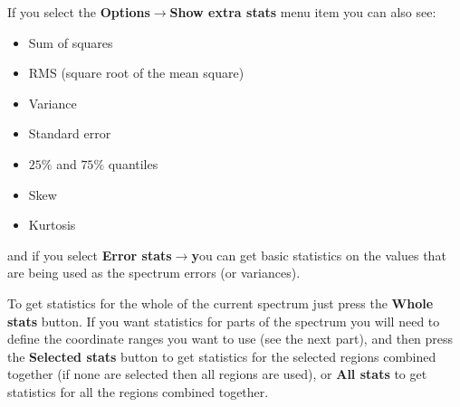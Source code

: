 \documentclass[twoside,11pt]{article}
\newcommand{\latexhtml}[2]{#1}
\renewcommand{\_}{\texttt{\symbol{95}}}
\newcommand{\submenuitem}[2]{\latexhtml{\textbf{#1$\rightarrow$#2}}{\textbf{#1->#2}}}
\newcommand{\labelitem}[1]{\textbf{#1}}
\begin{document}
If you select the \submenuitem{Options}{Show extra stats} menu item
you can also see:
\begin{itemize}
\item Sum of squares
\item RMS (square root of the mean square)
\item Variance
\item Standard error
\item $25\%$ and $75\%$ quantiles
\item Skew
\item Kurtosis
\end{itemize}
and if you select \submenuitem{Error stats} you can get basic statistics
on the values that are being used as the spectrum errors (or variances).

To get statistics for the whole of the current spectrum just press the
\labelitem{Whole stats} button. If you want statistics for parts of the
spectrum you will need to define the coordinate ranges you want to use (see
the next part), and then press the \labelitem{Selected stats} button to get
statistics for the selected regions combined together (if none are selected
then all regions are used), or \labelitem{All stats} to get statistics for all
the regions combined together.
\end{document}
